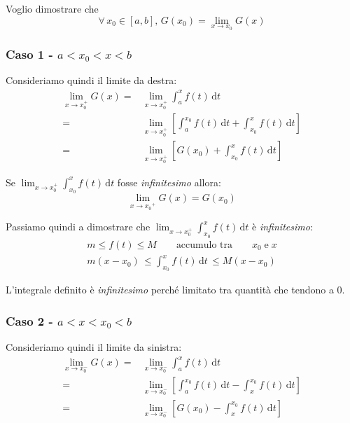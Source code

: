 \documentclass[../../dimostrazioni]{subfiles}
\begin{document}
                Voglio dimostrare che 
                \[\forall \, x_0 \in [a, b], \, G(x_0) = \lim_{x \to  x_0} G(x) \]
            
                \subsubsection*{Caso 1 - \(a < x_0 < x < b \)}

                    Consideriamo quindi il limite da destra:
                    \begin{align*}
                        \lim_{x \to x_0^+} G(x) =& \lim_{x \to x_0^+} \int_a^x \! f(t) \, \mathrm{d}t\\
                        =& \lim_{x \to x_0^+} \left[ \int_a^{x_0} \! f(t) \, \mathrm{d}t + \int_{x_0}^x \! f(t) \, \mathrm{d}t \right]\\
                        =& \lim_{x \to x_0^+} \left[ G(x_0) + \int_{x_0}^x \! f(t) \, \mathrm{d}t \right]
                    \end{align*}

                    Se \( \lim_{x \to x_0^+} \int_{x_0}^x \! f(t) \, \mathrm{d}t \) fosse \emph{infinitesimo} allora:
                    \[  \lim_{x \to {x_0}^{+}}G(x) = G(x_0) \]

                    Passiamo quindi a dimostrare che \( \lim_{x \to x_0^+} \int_{x_0}^x \! f(t) \, \mathrm{d}t \) è \emph{infinitesimo}:
                    \begin{gather*}
                        m \leqslant f(t) \leqslant M \qquad \text {accumulo tra} \qquad x_0 \; \text{e} \; x\\
                        m(x-x_0) \, \leqslant \int_{x_0}^x \! f(t) \, \mathrm{d}t \, \leqslant M(x-x_0)
                    \end{gather*}

                    L'integrale definito è \emph{infinitesimo} perché limitato tra quantità che tendono a 0.

                \subsubsection*{Caso 2 - \(a < x < x_0 < b \)}

                    Consideriamo quindi il limite da sinistra:
                    \begin{align*}
                        \lim_{x \to x_0^-} G(x) =& \lim_{x \to x_0^-} \int_a^x \! f(t) \, \mathrm{d}t\\
                        =& \lim_{x \to x_0^-} \left[ \int_a^{x_0} \! f(t) \, \mathrm{d}t - \int_x^{x_0} \! f(t) \, \mathrm{d}t \right]\\
                        =& \lim_{x \to x_0^-} \left[ G(x_0) - \int_x^{x_0} \! f(t) \, \mathrm{d}t \right]
                    \end{align*}
\end{document}
